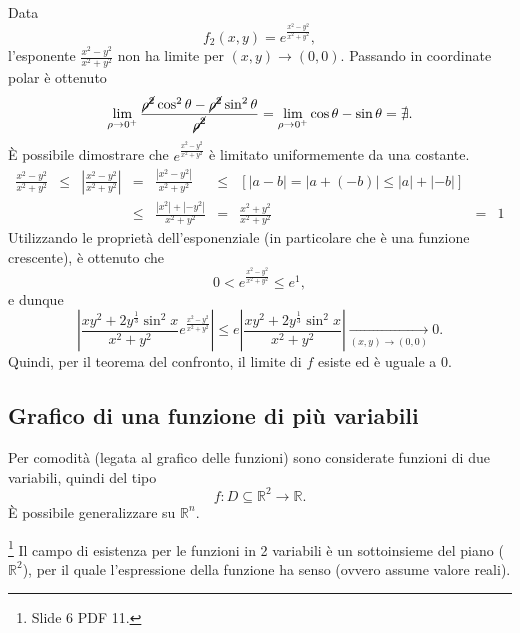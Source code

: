 \begin{example}
	\noindent Data
	\begin{equation*}
		f_2(x,y) = e^{\frac{x^2-y^2}{x^2+y^2}},
	\end{equation*}
	l'esponente $\frac{x^2-y^2}{x^2+y^2}$ non ha limite per $(x,y)\rightarrow(0,0)$. Passando in coordinate polar è ottenuto
	\begin{equation*}
		\lim\limits_{\rho\rightarrow 0^+} \frac{\cancel{\rho^2} \cos^2\theta - \cancel{\rho^2}\sin^2\theta}{\cancel{\rho^2}} = \lim\limits_{\rho \rightarrow 0^+}\cos\theta-\sin\theta =\nexists.
	\end{equation*}
	È possibile dimostrare che $e^{\frac{x^2-y^2}{x^2+y^2}}$ è limitato uniformemente da una costante.
	\begin{equation*}
		\begin{matrix}
			\frac{x^2-y^2}{x^2+y^2} &\leq& \left|\frac{x^2-y^2}{x^2+y^2}\right| &=&  \frac{|x^2-y^2|}{x^2+y^2} &\leq& [|a-b| = |a+(-b)| \leq |a| + |-b|]\\
			&&&\leq& \frac{|x^2|+|-y^2|}{x^2+y^2} &=& \frac{x^2+y^2}{x^2+y^2} &=& 1
		\end{matrix}
	\end{equation*}
	Utilizzando le proprietà dell'esponenziale (in particolare che è una funzione crescente), è ottenuto che
	\begin{equation*}
		0 < e^{\frac{x^2-y^2}{x^2+y^2}} \leq e^1,
	\end{equation*}
	e dunque
	\begin{equation*}
		\left|\frac{xy^2+2y^{\frac{1}{3}}\sin^2x}{x^2+y^2}e^{\frac{x^2-y^2}{x^2+y^2}}\right| \leq e \left|\frac{xy^2+2y^{\frac{1}{3}}\sin^2x}{x^2+y^2}\right|\underset{(x,y)\rightarrow (0,0)}{\longrightarrow} 0.
	\end{equation*}
	Quindi, per il teorema del confronto, il limite di $f$ esiste ed è uguale a 0.
\end{example}

\subsection{Grafico di una funzione di più variabili}\label{ssec:grafico_funzione_n_variabili}
Per comodità (legata al grafico delle funzioni) sono considerate funzioni di due variabili, quindi del tipo
\begin{equation*}
	f : D\subseteq\mathbb R^2\rightarrow\mathbb R.
\end{equation*}
È possibile generalizzare su $\mathbb R^n$.

\begin{definition}\footnote{Slide 6 PDF 11.}
    Il campo di esistenza per le funzioni in 2 variabili è un sottoinsieme del piano ($\mathbb R^2$), per il quale l'espressione della funzione ha senso (ovvero assume valore reali).
\end{definition}


